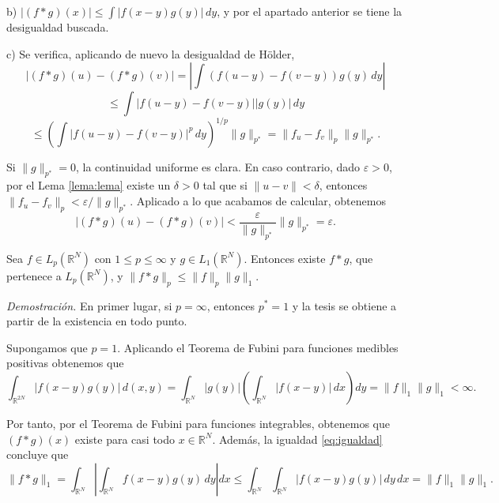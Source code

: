 \vspace{0.4cm}

b) $|(f * g)(x)| \leq \int |f(x - y)g(y)| \, dy$, y por el apartado anterior se tiene la desigualdad buscada.

\vspace{0.4cm}

c) Se verifica, aplicando de nuevo la desigualdad de Hölder,
\[
|(f * g)(u) - (f * g)(v)| = \left| \int (f(u - y) - f(v - y)) g(y) \, dy \right|
\]
\[
\leq \int |f(u - y) - f(v - y)| |g(y)| \, dy
\]
\[
\leq \left( \int |f(u - y) - f(v - y)|^p \, dy \right)^{1/p} \|g\|_{p^*} = \|f_u - f_v\|_p \|g\|_{p^*}.
\]

\vspace{0.3cm}

Si $\|g\|_{p^*} = 0$, la continuidad uniforme es clara. En caso contrario, dado $\varepsilon > 0$, por el Lema \ref{lema:lema} existe un $\delta > 0$ tal que si $\|u - v\| < \delta$, entonces $\|f_u - f_v\|_p < \varepsilon / \|g\|_{p^*}$. Aplicado a lo que acabamos de calcular, obtenemos
\[
|(f * g)(u) - (f * g)(v)| < \frac{\varepsilon}{\|g\|_{p^*}} \|g\|_{p^*} = \varepsilon. \tag*{$\Box$}
\]

\begin{proposicion}[Existencia c.p.d.]
Sea $f \in L_p(\mathbb{R}^N)$ con $1 \leq p \leq \infty$ y $g \in L_1(\mathbb{R}^N)$. Entonces existe $f * g$, que pertenece a $L_p(\mathbb{R}^N)$, y $\|f * g\|_p \leq \|f\|_p \|g\|_1$.
\end{proposicion}

\vspace{0.3cm}

\textit{Demostración.} En primer lugar, si $p = \infty$, entonces $p^* = 1$ y la tesis se obtiene a partir de la existencia en todo punto.

\vspace{0.3cm}

Supongamos que $p = 1$. Aplicando el Teorema de Fubini para funciones medibles positivas obtenemos que
\begin{equation}
\int_{\mathbb{R}^{2N}} |f(x - y)g(y)| \, d(x,y) = \int_{\mathbb{R}^N} |g(y)| \left( \int_{\mathbb{R}^N} |f(x - y)| \, dx \right) dy = \|f\|_1 \|g\|_1 < \infty. \label{eq:igualdad}
\end{equation}

Por tanto, por el Teorema de Fubini para funciones integrables, obtenemos que $(f * g)(x)$ existe para casi todo $x \in \mathbb{R}^N$. Además, la igualdad \eqref{eq:igualdad} concluye que
\[
\|f * g\|_1 = \int_{\mathbb{R}^N} \left| \int_{\mathbb{R}^N} f(x - y)g(y) \, dy \right| dx \leq \int_{\mathbb{R}^N} \int_{\mathbb{R}^N} |f(x - y)g(y)| \, dy \, dx = \|f\|_1 \|g\|_1.
\]

